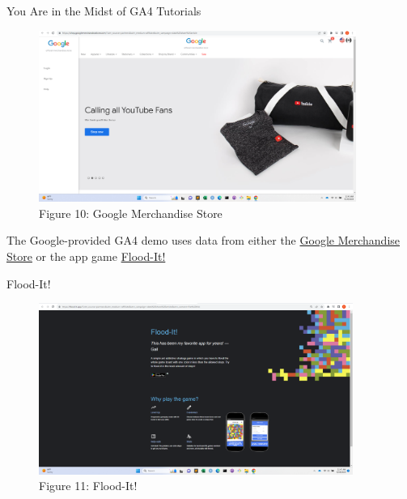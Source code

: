 \documentclass[pdf]{beamer}
\theoremstyle{remark}
\theoremstyle{definition}
\begin{document}
\begin{frame}[t]{You Are in the Midst of GA4 Tutorials}
\begin{figure}[htbp]
  \captionsetup{justification=centering}
  \includegraphics[height=5.6cm, trim=1.5cm 0.0cm 2.0cm 0.0cm width=5.6cm]{Images/GA4_1_091923.png}
  \caption{Figure {\color{franklinblue} 10}: Google Merchandise Store}
\end{figure}
\vspace{-2.0ex}
The Google-provided GA4 demo uses data from either the \href{https://shop.googlemerchandisestore.com/}{Google Merchandise Store} or the app game \href{https://flood-it.app/}{Flood-It!}
\end{frame}

\begin{frame}[t]{Flood-It!}
\begin{figure}[htbp]
  \captionsetup{justification=centering}
  \includegraphics[height=5.6cm, trim=1.5cm 0.0cm 2.0cm 0.0cm width=5.6cm]{Images/GA4_2_091923.png}
  \caption{Figure {\color{franklinblue} 11}: Flood-It!}
\end{figure}
\end{frame}
\end{document}
